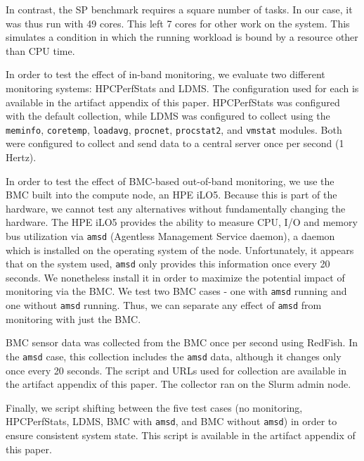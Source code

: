 \documentclass[conference]{IEEEtran}
\begin{document}
In contrast, the SP benchmark requires a square number of tasks. In our case, 
it was thus run with 49 cores. This left 7 cores for other work on the system. 
This simulates a condition in which the running workload is bound by a resource 
other than CPU time.

In order to test the effect of in-band monitoring, we evaluate two different 
monitoring systems: HPCPerfStats and LDMS. The configuration used for each is
available in the artifact appendix of this paper. HPCPerfStats was configured 
with the default collection, while LDMS was configured to collect using the 
\texttt{meminfo}, \texttt{coretemp}, \texttt{loadavg}, \texttt{procnet}, 
\texttt{procstat2}, and \texttt{vmstat} modules. Both were configured to collect 
and send data to a central server once per second (1 Hertz).

In order to test the effect of BMC-based out-of-band monitoring, we use the BMC 
built into the compute node, an HPE iLO5. Because this is part of the hardware, 
we cannot test any alternatives without fundamentally changing the hardware.
The HPE iLO5 provides the ability to measure CPU, I/O and memory bus utilization 
via \texttt{amsd} (Agentless Management Service daemon)\cite{HPEAgentlessManagement},
a daemon which is installed on the operating system of the node.
Unfortunately, it appears that on the system used, \texttt{amsd} only provides 
this information once every 20 seconds. We nonetheless install it in order to 
maximize the potential impact of monitoring via the BMC. We test two BMC cases 
- one with \texttt{amsd} running and one without \texttt{amsd} running. Thus, we 
can separate any effect of \texttt{amsd} from monitoring with just the BMC.

BMC sensor data was collected from the BMC once per second using RedFish.
In the \texttt{amsd} case, this collection includes the \texttt{amsd} data, although it changes only once 
every 20 seconds. The 
script and URLs used for collection are available in the artifact appendix of 
this paper. The collector ran on the Slurm admin node.

Finally, we script shifting between the five test cases (no monitoring, 
HPCPerfStats, LDMS, BMC with \texttt{amsd}, and BMC without \texttt{amsd}) in 
order to ensure consistent system state.
This script is available in the artifact appendix of this paper.

\end{document}
